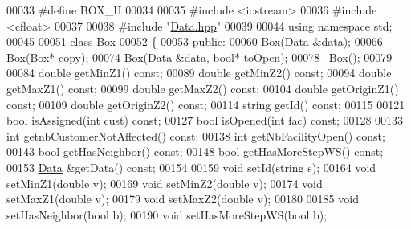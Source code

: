 \begin{DoxyCode}
00033 \textcolor{preprocessor}{}\textcolor{preprocessor}{#define BOX\_H}
00034 \textcolor{preprocessor}{}
00035 \textcolor{preprocessor}{#include <iostream>}
00036 \textcolor{preprocessor}{#include <cfloat>}
00037 
00038 \textcolor{preprocessor}{#include "\hyperlink{Data_8hpp}{Data.hpp}"}
00039 
00044 \textcolor{keyword}{using namespace }std;
00045 
\hypertarget{Box_8hpp_source_l00051}{}\hyperlink{classBox}{00051} \textcolor{keyword}{class }\hyperlink{classBox}{Box}
00052 \{
00053 \textcolor{keyword}{public}:
00060     \hyperlink{classBox}{Box}(\hyperlink{classData}{Data} &data);
00066     \hyperlink{classBox}{Box}(\hyperlink{classBox}{Box}* copy);
00074     \hyperlink{classBox}{Box}(\hyperlink{classData}{Data} &data, \textcolor{keywordtype}{bool}* toOpen);
00078     ~\hyperlink{classBox}{Box}();
00079     
00084     \textcolor{keywordtype}{double} getMinZ1() \textcolor{keyword}{const};
00089     \textcolor{keywordtype}{double} getMinZ2() \textcolor{keyword}{const};
00094     \textcolor{keywordtype}{double} getMaxZ1() \textcolor{keyword}{const};
00099     \textcolor{keywordtype}{double} getMaxZ2() \textcolor{keyword}{const};
00104     \textcolor{keywordtype}{double} getOriginZ1() \textcolor{keyword}{const};
00109     \textcolor{keywordtype}{double} getOriginZ2() \textcolor{keyword}{const};
00114     \textcolor{keywordtype}{string} getId() \textcolor{keyword}{const};
00115     
00121     \textcolor{keywordtype}{bool} isAssigned(\textcolor{keywordtype}{int} cust) \textcolor{keyword}{const};
00127     \textcolor{keywordtype}{bool} isOpened(\textcolor{keywordtype}{int} fac) \textcolor{keyword}{const};
00128     
00133     \textcolor{keywordtype}{int} getnbCustomerNotAffected() \textcolor{keyword}{const};
00138     \textcolor{keywordtype}{int} getNbFacilityOpen() \textcolor{keyword}{const};
00143     \textcolor{keywordtype}{bool} getHasNeighbor() \textcolor{keyword}{const};
00148     \textcolor{keywordtype}{bool} getHasMoreStepWS() \textcolor{keyword}{const};
00153     \hyperlink{classData}{Data} &getData() \textcolor{keyword}{const};
00154     
00159     \textcolor{keywordtype}{void} setId(\textcolor{keywordtype}{string} s);
00164     \textcolor{keywordtype}{void} setMinZ1(\textcolor{keywordtype}{double} v);
00169     \textcolor{keywordtype}{void} setMinZ2(\textcolor{keywordtype}{double} v);
00174     \textcolor{keywordtype}{void} setMaxZ1(\textcolor{keywordtype}{double} v);
00179     \textcolor{keywordtype}{void} setMaxZ2(\textcolor{keywordtype}{double} v);
00180 
00185     \textcolor{keywordtype}{void} setHasNeighbor(\textcolor{keywordtype}{bool} b);
00190     \textcolor{keywordtype}{void} setHasMoreStepWS(\textcolor{keywordtype}{bool} b);

\end{DoxyCode}
